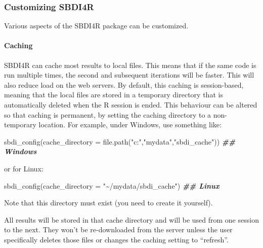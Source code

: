 \documentclass[
  10pt,
]{article}
\newenvironment{Shaded}{\begin{snugshade}}{\end{snugshade}}
\newcommand{\AttributeTok}[1]{\textcolor[rgb]{0.77,0.63,0.00}{#1}}
\newcommand{\DocumentationTok}[1]{\textcolor[rgb]{0.56,0.35,0.01}{\textbf{\textit{#1}}}}
\newcommand{\FunctionTok}[1]{\textcolor[rgb]{0.00,0.00,0.00}{#1}}
\newcommand{\NormalTok}[1]{#1}
\newcommand{\StringTok}[1]{\textcolor[rgb]{0.31,0.60,0.02}{#1}}
\begin{document}
\hypertarget{customizing-sbdi4r}{%
\subsubsection*{Customizing SBDI4R}\label{customizing-sbdi4r}}

Various aspects of the SBDI4R package can be customized.

\hypertarget{caching}{%
\paragraph*{Caching}\label{caching}}

SBDI4R can cache most results to local files. This means that if the same code is run multiple times, the second and subsequent iterations will be faster. This will also reduce load on the web servers. By default, this caching is session-based, meaning that the local files are stored in a temporary directory that is automatically deleted when the R session is ended. This behaviour can be altered so that caching is permanent, by setting the caching directory to a non-temporary location. For example, under Windows, use something like:

\begin{Shaded}
\begin{Highlighting}[]
\FunctionTok{sbdi\_config}\NormalTok{(}\AttributeTok{cache\_directory =} \FunctionTok{file.path}\NormalTok{(}\StringTok{"c:"}\NormalTok{,}\StringTok{"mydata"}\NormalTok{,}\StringTok{"sbdi\_cache"}\NormalTok{)) }\DocumentationTok{\#\# Windows}
\end{Highlighting}
\end{Shaded}

or for Linux:

\begin{Shaded}
\begin{Highlighting}[]
\FunctionTok{sbdi\_config}\NormalTok{(}\AttributeTok{cache\_directory =} \StringTok{"\textasciitilde{}/mydata/sbdi\_cache"}\NormalTok{) }\DocumentationTok{\#\# Linux}
\end{Highlighting}
\end{Shaded}

Note that this directory must exist (you need to create it yourself).

All results will be stored in that cache directory and will be used from one session to the next. They won't be re-downloaded from the server unless the user specifically deletes those files or changes the caching setting to ``refresh''.
\end{document}
